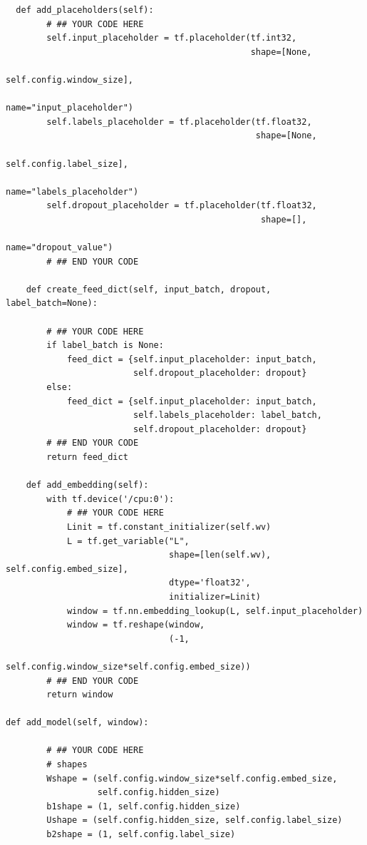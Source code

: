 \documentclass{article}
\begin{document}
\begin{verbatim}
  def add_placeholders(self):
        # ## YOUR CODE HERE
        self.input_placeholder = tf.placeholder(tf.int32,
                                                shape=[None,
                                                       self.config.window_size],
                                                name="input_placeholder")
        self.labels_placeholder = tf.placeholder(tf.float32,
                                                 shape=[None,
                                                        self.config.label_size],
                                                 name="labels_placeholder")
        self.dropout_placeholder = tf.placeholder(tf.float32,
                                                  shape=[],
                                                  name="dropout_value")
        # ## END YOUR CODE

    def create_feed_dict(self, input_batch, dropout, label_batch=None):
        
        # ## YOUR CODE HERE
        if label_batch is None:
            feed_dict = {self.input_placeholder: input_batch,
                         self.dropout_placeholder: dropout}
        else:
            feed_dict = {self.input_placeholder: input_batch,
                         self.labels_placeholder: label_batch,
                         self.dropout_placeholder: dropout}
        # ## END YOUR CODE
        return feed_dict

    def add_embedding(self):
        with tf.device('/cpu:0'):
            # ## YOUR CODE HERE
            Linit = tf.constant_initializer(self.wv)
            L = tf.get_variable("L",
                                shape=[len(self.wv), self.config.embed_size],
                                dtype='float32',
                                initializer=Linit)
            window = tf.nn.embedding_lookup(L, self.input_placeholder)
            window = tf.reshape(window,
                                (-1,
                                 self.config.window_size*self.config.embed_size))
        # ## END YOUR CODE
        return window

def add_model(self, window):
     
        # ## YOUR CODE HERE
        # shapes
        Wshape = (self.config.window_size*self.config.embed_size,
                  self.config.hidden_size)
        b1shape = (1, self.config.hidden_size)
        Ushape = (self.config.hidden_size, self.config.label_size)
        b2shape = (1, self.config.label_size)


\end{verbatim}
\end{document}
